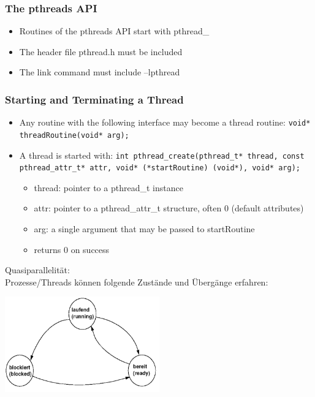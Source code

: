 \subsubsection{The pthreads API}
\begin{itemize}
\item Routines of the pthreads API start with pthread\_
\item The header file pthread.h must be included
\item The link command must include –lpthread
\end{itemize}
\subsubsection{Starting and Terminating a Thread}
\begin{itemize}
\item Any routine with the following interface may become a thread routine:\newline
\lstinline{void* threadRoutine(void* arg);}
\item A thread is started with:\newline
\lstinline{int pthread_create(pthread_t* thread, const pthread_attr_t* attr, void* (*startRoutine) (void*), void* arg);}
  \begin{itemize}
  \item thread: pointer to a pthread\_t instance
  \item attr: pointer to a pthread\_attr\_t structure, often 0 (default attributes)
  \item arg: a single argument that may be passed to startRoutine
  \item returns 0 on success 
  \end{itemize}
\end{itemize}





Quasiparallelität:\\
Prozesse/Threads können folgende Zustände und Übergänge erfahren: 
\begin{center}
{\includegraphics[width=0.5\textwidth]{images/Concurrency/Prozesszustaende.png}}
\end{center}

